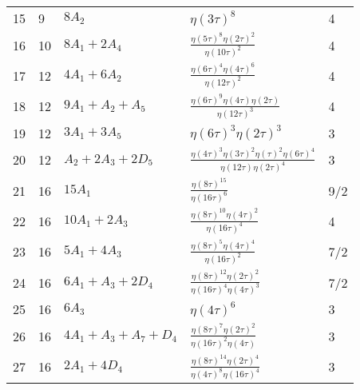 \documentclass{article}
\theoremstyle{definition}
\begin{document}
\begin{longtable}{|l|l|l|l|l|}
  15 & 9 & $8 A_{2}$ & $ \eta \left( 3\tau \right)   ^{8}$ & 4 \\ 
  16 & 10 & $8 A_{1} + 2 A_{4}$ & ${\frac {  \eta \left( 5\tau \right)   ^{8}  \eta \left( 2\tau \right)   ^{2}}{  \eta \left( 10\tau \right)   ^{2}}}$ & 4 \\ 
  17 & 12 & $4 A_{1} + 6 A_{2}$ & ${\frac {  \eta \left( 6\tau \right)   ^{4}  \eta \left( 4\tau \right)   ^{6}}{  \eta \left( 12\tau \right)   ^{2}}}$ & 4 \\ 
  18 & 12 & $9 A_{1} +  A_{2} +  A_{5}$ & ${\frac {  \eta \left( 6\tau \right)   ^{9}\eta \left( 4\tau \right) \eta \left( 2\tau \right) }{  \eta \left( 12\tau \right)   ^{3}}}$ & 4 \\ 
  19 & 12 & $3 A_{1} + 3 A_{5}$ & $ \eta \left( 6\tau \right)   ^{3}  \eta \left( 2\tau \right)   ^{3}$ & 3 \\ 
  20 & 12 & $ A_{2} + 2 A_{3} + 2 D_{5}$ & ${\frac {  \eta \left( 4\tau \right)   ^{3}  \eta \left( 3\tau \right)   ^{2}  \eta \left( \tau \right)   ^{2} \mbox{}  \eta \left( 6\tau \right)   ^{4}}{\eta \left( 12\tau \right)   \eta \left( 2\tau \right)   ^{4}}}$ & 3 \\ 
  21 & 16 & $15 A_{1}$ & ${\frac {  \eta \left( 8\tau \right)   ^{15}}{  \eta \left( 16\tau \right)   ^{6}}}$ & 9/2 \\ 
  22 & 16 & $10 A_{1} + 2 A_{3}$ & ${\frac {  \eta \left( 8\tau \right)   ^{10}  \eta \left( 4\tau \right)   ^{2}}{  \eta \left( 16\tau \right)   ^{4}}}$ & 4 \\ 
  23 & 16 & $5 A_{1} + 4 A_{3}$ & ${\frac {  \eta \left( 8\tau \right)   ^{5}  \eta \left( 4\tau \right)   ^{4}}{  \eta \left( 16\tau \right)   ^{2}}}$ & 7/2 \\ 
  24 & 16 & $6 A_{1} +  A_{3} + 2 D_{4}$ & ${\frac {  \eta \left( 8\tau \right)   ^{12}  \eta \left( 2\tau \right)   ^{2}}{  \eta \left( 16\tau \right)   ^{4} \mbox{}  \eta \left( 4\tau \right)   ^{3}}}$ & 7/2 \\ 
  25 & 16 & $6 A_{3}$ & $ \eta \left( 4\tau \right)   ^{6}$ & 3 \\ 
  26 & 16 & $4 A_{1} +  A_{3} +  A_{7} +  D_{4}$ & ${\frac {  \eta \left( 8\tau \right)   ^{7}  \eta \left( 2\tau \right)   ^{2}}{  \eta \left( 16\tau \right)   ^{2} \mbox{}\eta \left( 4\tau \right) }}$ & 3 \\ 
  27 & 16 & $2 A_{1} + 4 D_{4}$ & ${\frac {  \eta \left( 8\tau \right)   ^{14}  \eta \left( 2\tau \right)   ^{4}}{  \eta \left( 4\tau \right)   ^{8} \mbox{}  \eta \left( 16\tau \right)   ^{4}}}$ & 3 \\ 

\end{longtable}
\end{document}
